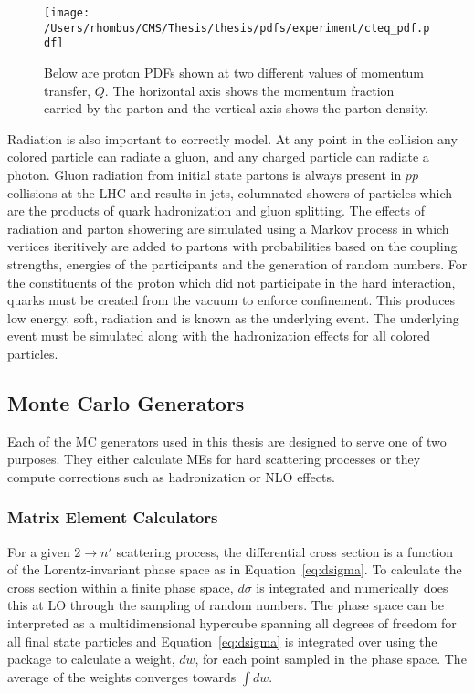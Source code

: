 \begin{figure}[htb]
 \center
 \caption[Example Parton Distribution Function from CTEQ6M]{
  Below are proton PDFs shown at two different values of
   momentum transfer, $Q$. 
  The horizontal axis shows the
   momentum fraction carried by the parton
   and the vertical axis shows the parton density.
 } 
 \texttt{[image: /Users/rhombus/CMS/Thesis/thesis/pdfs/experiment/cteq\_pdf.pdf]}
    \label{fig:cteqpdfs}
\end{figure}

 Radiation is also important to correctly model.
 At any point in the collision
  any colored particle can radiate a gluon,
  and any charged particle can radiate a photon.
 Gluon radiation from initial state partons is always present
  in $pp$ collisions at the LHC
  and results in jets, columnated showers
  of particles which are the products of quark hadronization
  and gluon splitting.
 The effects of radiation and parton showering are simulated
  using a Markov process in which 
  vertices iteritively are added to partons
  with probabilities based on the
  coupling strengths, energies of the participants
  and the generation of random numbers.
 For the constituents of the proton which
  did not participate in the hard interaction,
  quarks must be created from the vacuum
  to enforce confinement.
 This produces low energy, soft, radiation
  and is known as the underlying event.
 The underlying event must be simulated
  along with the hadronization effects for
  all colored particles.

\subsection{Monte Carlo Generators}

Each of the MC generators used in this
 thesis are designed to serve one of two
 purposes. 
They either calculate MEs for hard
 scattering processes or they compute
 corrections such as hadronization
 or NLO effects.

  
\subsubsection{Matrix Element Calculators}
 For a given $2\rightarrow n'$
  scattering process, the differential cross section is
  a function of the Lorentz-invariant phase space
  as in Equation~\ref{eq:dsigma}.
 To calculate the cross section within 
  a finite phase space, $d\sigma$
  is integrated and 
  \MADGRAPH numerically does this at LO
  through the sampling of random numbers.
 The phase space can be interpreted as a multidimensional 
  hypercube spanning all degrees of freedom
  for all final state particles
  and Equation~\ref{eq:dsigma} is 
  integrated over using the \VEGAS package
  to calculate a weight, $dw$, for each point
  sampled in the phase space.
 The average
  of the weights converges towards $\int dw$.

